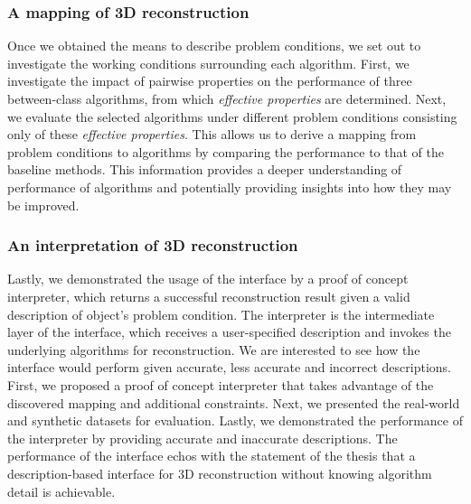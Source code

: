 \subsubsection{A mapping of 3D reconstruction}
Once we obtained the means to describe problem conditions, we set out to investigate the working conditions surrounding each algorithm. First, we investigate the impact of pairwise properties on the performance of three between-class algorithms, from which \textit{effective properties} are determined. Next, we evaluate the selected algorithms under different problem conditions consisting only of these \textit{effective properties}. This allows us to derive a mapping from problem conditions to algorithms by comparing the performance to that of the baseline methods. This information provides a deeper understanding of performance of algorithms and potentially providing insights into how they may be improved.

\subsubsection{An interpretation of 3D reconstruction}
Lastly, we demonstrated the usage of the interface by a proof of concept interpreter, which returns a successful reconstruction result given a valid description of object's problem condition. The interpreter is the intermediate layer of the interface, which receives a user-specified description and invokes the underlying algorithms for reconstruction. We are interested to see how the interface would perform given accurate, less accurate and incorrect descriptions. First, we proposed a proof of concept interpreter that takes advantage of the discovered mapping and additional constraints. Next, we presented the real-world and synthetic datasets for evaluation. Lastly, we demonstrated the performance of the interpreter by providing accurate and inaccurate descriptions. The performance of the interface echos with the statement of the thesis that a description-based interface for 3D reconstruction without knowing algorithm detail is achievable.\\

